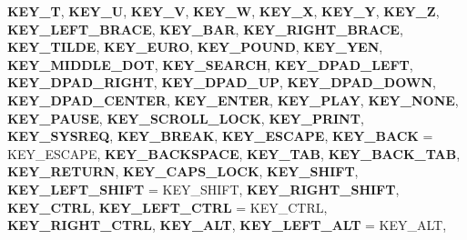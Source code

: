 \begin{DoxyCompactItemize}
{\bfseries K\+E\+Y\+\_\+T}, 
\newline
{\bfseries K\+E\+Y\+\_\+U}, 
{\bfseries K\+E\+Y\+\_\+V}, 
{\bfseries K\+E\+Y\+\_\+W}, 
{\bfseries K\+E\+Y\+\_\+X}, 
\newline
{\bfseries K\+E\+Y\+\_\+Y}, 
{\bfseries K\+E\+Y\+\_\+Z}, 
{\bfseries K\+E\+Y\+\_\+\+L\+E\+F\+T\+\_\+\+B\+R\+A\+CE}, 
{\bfseries K\+E\+Y\+\_\+\+B\+AR}, 
\newline
{\bfseries K\+E\+Y\+\_\+\+R\+I\+G\+H\+T\+\_\+\+B\+R\+A\+CE}, 
{\bfseries K\+E\+Y\+\_\+\+T\+I\+L\+DE}, 
{\bfseries K\+E\+Y\+\_\+\+E\+U\+RO}, 
{\bfseries K\+E\+Y\+\_\+\+P\+O\+U\+ND}, 
\newline
{\bfseries K\+E\+Y\+\_\+\+Y\+EN}, 
{\bfseries K\+E\+Y\+\_\+\+M\+I\+D\+D\+L\+E\+\_\+\+D\+OT}, 
{\bfseries K\+E\+Y\+\_\+\+S\+E\+A\+R\+CH}, 
{\bfseries K\+E\+Y\+\_\+\+D\+P\+A\+D\+\_\+\+L\+E\+FT}, 
\newline
{\bfseries K\+E\+Y\+\_\+\+D\+P\+A\+D\+\_\+\+R\+I\+G\+HT}, 
{\bfseries K\+E\+Y\+\_\+\+D\+P\+A\+D\+\_\+\+UP}, 
{\bfseries K\+E\+Y\+\_\+\+D\+P\+A\+D\+\_\+\+D\+O\+WN}, 
{\bfseries K\+E\+Y\+\_\+\+D\+P\+A\+D\+\_\+\+C\+E\+N\+T\+ER}, 
\newline
{\bfseries K\+E\+Y\+\_\+\+E\+N\+T\+ER}, 
{\bfseries K\+E\+Y\+\_\+\+P\+L\+AY}, 
{\bfseries K\+E\+Y\+\_\+\+N\+O\+NE}, 
{\bfseries K\+E\+Y\+\_\+\+P\+A\+U\+SE}, 
\newline
{\bfseries K\+E\+Y\+\_\+\+S\+C\+R\+O\+L\+L\+\_\+\+L\+O\+CK}, 
{\bfseries K\+E\+Y\+\_\+\+P\+R\+I\+NT}, 
{\bfseries K\+E\+Y\+\_\+\+S\+Y\+S\+R\+EQ}, 
{\bfseries K\+E\+Y\+\_\+\+B\+R\+E\+AK}, 
\newline
{\bfseries K\+E\+Y\+\_\+\+E\+S\+C\+A\+PE}, 
{\bfseries K\+E\+Y\+\_\+\+B\+A\+CK} = K\+E\+Y\+\_\+\+E\+S\+C\+A\+PE, 
{\bfseries K\+E\+Y\+\_\+\+B\+A\+C\+K\+S\+P\+A\+CE}, 
{\bfseries K\+E\+Y\+\_\+\+T\+AB}, 
\newline
{\bfseries K\+E\+Y\+\_\+\+B\+A\+C\+K\+\_\+\+T\+AB}, 
{\bfseries K\+E\+Y\+\_\+\+R\+E\+T\+U\+RN}, 
{\bfseries K\+E\+Y\+\_\+\+C\+A\+P\+S\+\_\+\+L\+O\+CK}, 
{\bfseries K\+E\+Y\+\_\+\+S\+H\+I\+FT}, 
\newline
{\bfseries K\+E\+Y\+\_\+\+L\+E\+F\+T\+\_\+\+S\+H\+I\+FT} = K\+E\+Y\+\_\+\+S\+H\+I\+FT, 
{\bfseries K\+E\+Y\+\_\+\+R\+I\+G\+H\+T\+\_\+\+S\+H\+I\+FT}, 
{\bfseries K\+E\+Y\+\_\+\+C\+T\+RL}, 
{\bfseries K\+E\+Y\+\_\+\+L\+E\+F\+T\+\_\+\+C\+T\+RL} = K\+E\+Y\+\_\+\+C\+T\+RL, 
\newline
{\bfseries K\+E\+Y\+\_\+\+R\+I\+G\+H\+T\+\_\+\+C\+T\+RL}, 
{\bfseries K\+E\+Y\+\_\+\+A\+LT}, 
{\bfseries K\+E\+Y\+\_\+\+L\+E\+F\+T\+\_\+\+A\+LT} = K\+E\+Y\+\_\+\+A\+LT, 

\end{DoxyCompactItemize}
